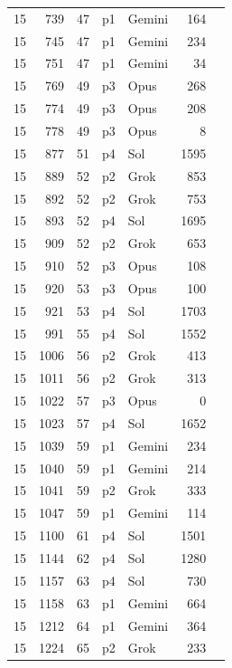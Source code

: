\begin{longtable}{r r r l l r L{2.2in}}
15 & 739 & 47 & p1 & Gemini & 164 &  \\
15 & 745 & 47 & p1 & Gemini & 234 &  \\
15 & 751 & 47 & p1 & Gemini & 34 &  \\
15 & 769 & 49 & p3 & Opus & 268 &  \\
15 & 774 & 49 & p3 & Opus & 208 &  \\
15 & 778 & 49 & p3 & Opus & 8 &  \\
15 & 877 & 51 & p4 & Sol & 1595 &  \\
15 & 889 & 52 & p2 & Grok & 853 &  \\
15 & 892 & 52 & p2 & Grok & 753 &  \\
15 & 893 & 52 & p4 & Sol & 1695 &  \\
15 & 909 & 52 & p2 & Grok & 653 &  \\
15 & 910 & 52 & p3 & Opus & 108 &  \\
15 & 920 & 53 & p3 & Opus & 100 &  \\
15 & 921 & 53 & p4 & Sol & 1703 &  \\
15 & 991 & 55 & p4 & Sol & 1552 &  \\
15 & 1006 & 56 & p2 & Grok & 413 &  \\
15 & 1011 & 56 & p2 & Grok & 313 &  \\
15 & 1022 & 57 & p3 & Opus & 0 &  \\
15 & 1023 & 57 & p4 & Sol & 1652 &  \\
15 & 1039 & 59 & p1 & Gemini & 234 &  \\
15 & 1040 & 59 & p1 & Gemini & 214 &  \\
15 & 1041 & 59 & p2 & Grok & 333 &  \\
15 & 1047 & 59 & p1 & Gemini & 114 &  \\
15 & 1100 & 61 & p4 & Sol & 1501 &  \\
15 & 1144 & 62 & p4 & Sol & 1280 &  \\
15 & 1157 & 63 & p4 & Sol & 730 &  \\
15 & 1158 & 63 & p1 & Gemini & 664 &  \\
15 & 1212 & 64 & p1 & Gemini & 364 &  \\
15 & 1224 & 65 & p2 & Grok & 233 &  \\

\end{longtable}
